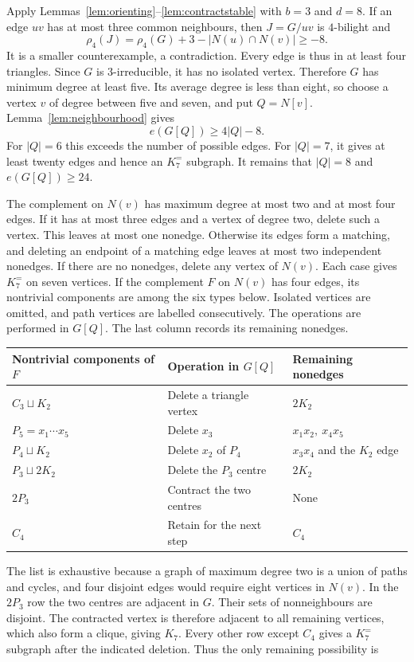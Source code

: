 \documentclass[11pt]{article}
\theoremstyle{remark}
\numberwithin{equation}{section}
\newcommand{\Ke}{K_7^{=}}
\begin{document}
Apply Lemmas~\ref{lem:orienting}--\ref{lem:contractstable} with $b=3$ and $d=8$. If an edge $uv$ has at most three common neighbours, then $J=G/uv$ is $4$-bilight and
\[
\rho_4(J)=\rho_4(G)+3-|N(u)\cap N(v)|\ge-8.
\]
It is a smaller counterexample, a contradiction. Every edge is thus in at least four triangles. Since $G$ is $3$-irreducible, it has no isolated vertex. Therefore $G$ has minimum degree at least five. Its average degree is less than eight, so choose a vertex $v$ of degree between five and seven, and put $Q=N[v]$. Lemma~\ref{lem:neighbourhood} gives
\[
e(G[Q])\ge4|Q|-8.
\]
For $|Q|=6$ this exceeds the number of possible edges. For $|Q|=7$, it gives at least twenty edges and hence an $\Ke$ subgraph. It remains that $|Q|=8$ and $e(G[Q])\ge24$.

The complement on $N(v)$ has maximum degree at most two and at most four edges. If it has at most three edges and a vertex of degree two, delete such a vertex. This leaves at most one nonedge. Otherwise its edges form a matching, and deleting an endpoint of a matching edge leaves at most two independent nonedges. If there are no nonedges, delete any vertex of $N(v)$. Each case gives $\Ke$ on seven vertices. If the complement $F$ on $N(v)$ has four edges, its nontrivial components are among the six types below. Isolated vertices are omitted, and path vertices are labelled consecutively. The operations are performed in $G[Q]$. The last column records its remaining nonedges.
\begin{center}
\small
\begin{tabular}{lll}
\toprule
Nontrivial components of $F$&Operation in $G[Q]$&Remaining nonedges\\
\midrule
$C_3\sqcup K_2$&Delete a triangle vertex&$2K_2$\\
$P_5=x_1\cdots x_5$&Delete $x_3$&$x_1x_2,\ x_4x_5$\\
$P_4\sqcup K_2$&Delete $x_2$ of $P_4$&$x_3x_4$ and the $K_2$ edge\\
$P_3\sqcup2K_2$&Delete the $P_3$ centre&$2K_2$\\
$2P_3$&Contract the two centres&None\\
$C_4$&Retain for the next step&$C_4$\\
\bottomrule
\end{tabular}
\end{center}
The list is exhaustive because a graph of maximum degree two is a union of paths and cycles, and four disjoint edges would require eight vertices in $N(v)$. In the $2P_3$ row the two centres are adjacent in $G$. Their sets of nonneighbours are disjoint. The contracted vertex is therefore adjacent to all remaining vertices, which also form a clique, giving $K_7$. Every other row except $C_4$ gives a $\Ke$ subgraph after the indicated deletion. Thus the only remaining possibility is
\end{document}
